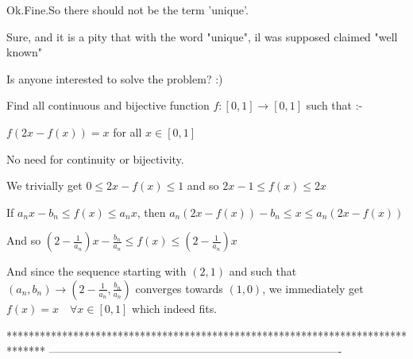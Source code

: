 \begin{solution}
	\begin{tcolorbox}Ok.Fine.So there should not be the term 'unique'.\end{tcolorbox}
Sure, and it is a pity that with the word "unique", il was supposed \/ claimed "well known"



\end{solution}



\begin{solution}
	Is anyone interested to solve the problem? :)
\end{solution}



\begin{solution}
	\begin{tcolorbox}Find all continuous and bijective function $f:[0,1]\rightarrow [0,1]$ such that :-

$f(2x-f(x))=x$ for all $x\in [0,1]$\end{tcolorbox}
No need for continuity or bijectivity.

We trivially get $0\le 2x-f(x)\le 1$ and so $2x-1\le f(x)\le 2x$

If $a_nx-b_n\le f(x)\le a_nx$, then $a_n(2x-f(x))-b_n\le x\le a_n(2x-f(x))$

And so $(2-\frac 1{a_n})x-\frac {b_n}{a_n}\le f(x)\le (2-\frac 1{a_n})x$

And since the sequence starting with $(2,1)$ and such that $(a_n,b_n)\to (2-\frac 1{a_n},\frac {b_n}{a_n})$ converges towards $(1,0)$, we immediately get 
$\boxed{f(x)=x\quad\forall x\in[0,1]}$ which indeed fits.
\end{solution}
*******************************************************************************
-------------------------------------------------------------------------------

